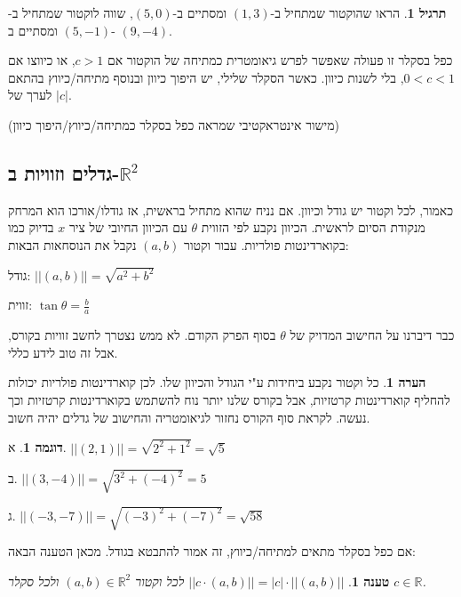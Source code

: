 \documentclass[12pt]{book}
\theoremstyle{plain}
\newtheorem{proposition}[theorem]{טענה}
\theoremstyle{definition}
\newtheorem{example}[theorem]{דוגמה}
\newtheorem{exercise}[theorem]{תרגיל}
\newtheorem{remark}[theorem]{הערה}
\newcommand{\R}{\mathbb{R}}
\begin{document}
\begin{exercise} 
הראו שהוקטור שמתחיל ב-\((1,3)\) ומסתיים ב-\((5,0)\), שווה לוקטור שמתחיל ב-
\((5,-1)\)
ומסתיים ב-
\((9,-4)\).
\end{exercise}

כפל בסקלר זו פעולה שאפשר לפרש גיאומטרית כמתיחה של הוקטור אם \(c>1\),
או כיווצו אם \(0<c<1\), בלי לשנות כיוון. כאשר הסקלר שלילי, יש היפוך
כיוון ובנוסף מתיחה/כיווץ בהתאם לערך של \(|c|\).
\begin{center}
(מישור אינטראקטיבי שמראה כפל בסקלר כמתיחה/כיווץ/היפוך כיוון)
\end{center}

\subsection{גדלים וזוויות ב-\(\R^{2}\)}

כאמור, לכל וקטור יש גודל וכיוון. אם נניח שהוא מתחיל בראשית, אז גודלו/אורכו
הוא המרחק מנקודת הסיום לראשית. הכיוון נקבע לפי הזווית \(\theta\)
עם הכיוון החיובי של ציר \(x\) בדיוק כמו בקוארדינטות פולריות.
עבור וקטור \((a,b)\) נקבל את הנוסחאות הבאות:

גודל: \(||(a,b)||=\sqrt{a^{2}+b^{2}}\)

זווית: \(\tan\theta=\frac{b}{a}\)

כבר דיברנו על החישוב המדויק של \(\theta\) בסוף הפרק הקודם.
לא ממש נצטרך לחשב זוויות בקורס, אבל זה טוב לידע כללי.

\begin{remark}
כל וקטור נקבע ביחידות ע"י הגודל והכיוון שלו. לכן
קוארדינטות פולריות יכולות להחליף קוארדינטות קרטזיות, אבל בקורס שלנו
יותר נוח להשתמש בקוארדינטות קרטזיות וכך נעשה. לקראת סוף הקורס נחזור לגיאומטריה והחישוב של גדלים יהיה חשוב.
\end{remark}

\begin{example}
א.
\(||(2,1)||=\sqrt{2^{2}+1^{2}}=\sqrt{5}\)

ב. 
\(||(3,-4)||=\sqrt{3^{2}+(-4)^{2}}=5\)

ג. 
\(||(-3,-7)||=\sqrt{(-3)^{2}+(-7)^{2}}=\sqrt{58}\)
\end{example}

אם כפל בסקלר מתאים למתיחה/כיווץ, זה אמור להתבטא בגודל. מכאן הטענה
הבאה:

\begin{proposition}\label{proposition:norm-scalar}
\(||c\cdot(a,b)||=|c|\cdot||(a,b)||\) לכל וקטור \((a,b)\in\R^{2}\)
ולכל סקלר \(c\in\R\).
\end{proposition}
\end{document}
